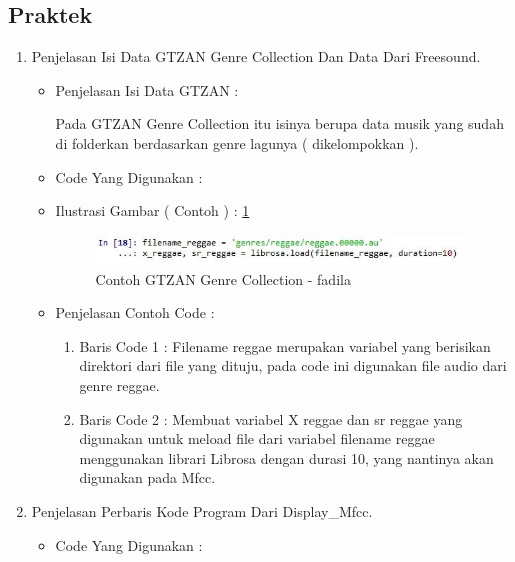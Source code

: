 \par
\par
\subsection{Praktek}
\begin{enumerate}
\item Penjelasan Isi Data GTZAN Genre Collection Dan Data Dari Freesound.
\begin{itemize}
\item Penjelasan Isi Data GTZAN :
\par Pada GTZAN Genre Collection itu isinya berupa data musik yang sudah di folderkan berdasarkan genre lagunya ( dikelompokkan ).
\par
\item Code Yang Digunakan :

\par
\item Ilustrasi Gambar ( Contoh ) : \ref{gtzan-fadila}
\par
\begin{figure}[!hbtp]
\centering
\includegraphics[scale=0.2]{figures/gtzan-fadila.jpg}
\caption{Contoh GTZAN Genre Collection - fadila}
\label{gtzan-fadila}
\end{figure}
\par
\item Penjelasan Contoh Code :
\begin{enumerate}
\item Baris Code 1 : Filename reggae merupakan variabel yang berisikan direktori dari file yang dituju, pada code ini digunakan file audio dari genre reggae.
\item Baris Code 2 : Membuat variabel X reggae dan sr reggae yang digunakan untuk meload file dari variabel filename reggae menggunakan librari Librosa dengan durasi 10, yang nantinya akan digunakan pada Mfcc.
\end{enumerate}
\end{itemize}
\par
\item Penjelasan Perbaris Kode Program Dari Display\_Mfcc.
\begin{itemize}
\item Code Yang Digunakan :


\end{itemize}
\end{enumerate}
